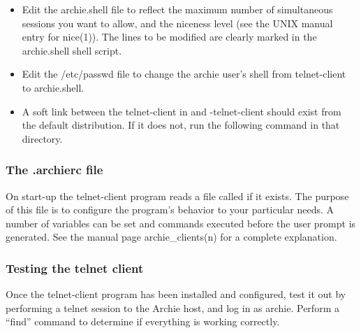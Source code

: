 \begin{itemize}
\item
Edit the archie.shell file to reflect the maximum number of simultaneous
sessions you want to allow, and the niceness level (see the UNIX manual entry
for nice(1)). The lines to be modified are clearly marked in the archie.shell
shell script.

\item
Edit the /etc/passwd file to change the archie user's shell from
telnet-client to archie.shell.

\item
A soft link between the telnet-client in  and -telnet-client
should exist from the default distribution. If it does not, run the following
command in that directory.


\end{itemize}

\subsubsection{The .archierc file}

On start-up the telnet-client program reads a file called  if
it exists. The purpose of this file is to configure the program's behavior to
your particular needs. A number of variables can be set and commands executed
before the user prompt is generated. See the manual page archie\_clients(n) for
a complete explanation.

\subsubsection{Testing the telnet client}

Once the telnet-client program has been installed and configured, test it out
by performing a telnet session to the Archie host, and log in as
archie. Perform a ``find'' command to determine if everything is working
correctly.



